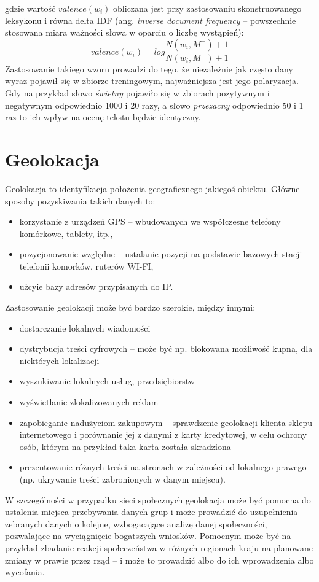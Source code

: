 gdzie wartość $valence(w_i)$ obliczana jest przy zastosowaniu skonstruowanego
leksykonu i równa delta IDF (ang. \textit{inverse document frequency} -- 
powszechnie stosowana miara ważności słowa w oparciu o liczbę wystąpień):
\begin{equation}
valence(w_i) = log\frac{N(w_i, M^+) + 1}{N(w_i, M^-) + 1}
\end{equation} 
Zastosowanie takiego wzoru prowadzi do tego, że niezależnie jak często
dany wyraz pojawił się w zbiorze treningowym, najważniejsza jest jego polaryzacja.
Gdy na przykład słowo \textit{świetny} pojawiło się w zbiorach pozytywnym
i negatywnym odpowiednio 1000 i 20 razy, a słowo \textit{przezacny} odpowiednio
50 i 1 raz to ich wpływ na ocenę tekstu będzie identyczny.






\clearpage\section{Geolokacja}
Geolokacja to identyfikacja położenia geograficznego jakiegoś obiektu.
Główne sposoby pozyskiwania takich danych to:
\begin{itemize}
  \item korzystanie z urządzeń GPS -- wbudowanych we współczesne telefony
komórkowe, tablety, itp.,
  \item pozycjonowanie względne -- ustalanie pozycji na podstawie bazowych stacji
telefonii komorków, ruterów WI-FI,
\item użcyie bazy adresów przypisanych do IP.
\end{itemize} 
Zastosowanie geolokacji może być bardzo szerokie, między innymi:
\begin{itemize}
  \item dostarczanie lokalnych wiadomości
  \item dystrybucja treści cyfrowych -- może być np. blokowana możliwość kupna, 
  dla niektórych lokalizacji
  \item wyszukiwanie lokalnych usług, przedsiębiorstw
  \item wyświetlanie zlokalizowanych reklam
  \item zapobieganie nadużyciom zakupowym -- sprawdzenie geolokacji
  klienta sklepu internetowego i porównanie jej z danymi z karty kredytowej,
  w celu ochrony osób, którym na przykład taka karta została skradziona
  \item prezentowanie różnych treści na stronach w zależności od lokalnego
  prawego (np. ukrywanie treści zabronionych w danym miejscu).
\end{itemize}
W szczególności w przypadku sieci społecznych geolokacja może być pomocna do
ustalenia miejsca przebywania danych grup i może prowadzić
do uzupełnienia zebranych danych o kolejne, wzbogacające analizę danej społeczności,
pozwalające na wyciągnięcie bogatszych wniosków. Pomocnym może być na przykład
zbadanie reakcji społeczeństwa w różnych regionach kraju na planowane zmiany
w prawie przez rząd -- i może to prowadzić albo do ich wprowadzenia albo wycofania.

